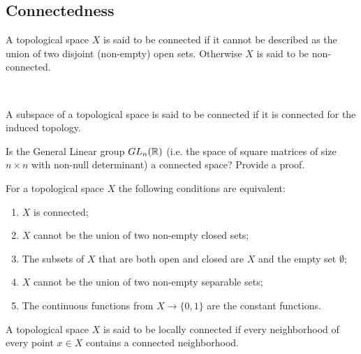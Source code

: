  \subsection{Connectedness}
\begin{definition} [{\bf Connectedness}] A topological space $X$ is said to be connected if it cannot be described as the union of two disjoint (non-empty) open sets. Otherwise $X$ is said to be non-connected.

\, 

A subspace of a topological space is said to be connected if it is connected for the induced topology.
\end{definition}
\begin{ex}\label{Ex:7}
Is the General Linear group $GL_n(\mathbb{R})$
(i.e. the space of square matrices of size $n\times n$ with non-null determinant) a connected space? Provide a proof.    
\end{ex}
\begin{theorem}%
For a topological space $X$ the following conditions are equivalent:
\begin{enumerate}
\item $X$ is connected;
\item $X$ cannot be the union of two non-empty closed sets;
\item The subsets of $X$ that are both open and closed are $X$ and the empty set $\emptyset$;
\item $X$ cannot be the union of two non-empty separable sets;
\item The continuous functions from $X\to \{0,1\}$ are the constant functions.
\end{enumerate}
\end{theorem}

\begin{definition} 
A topological space $X$ is said to be locally connected if every neighborhood of every point $x \in X$ contains a connected neighborhood.
\end{definition}

